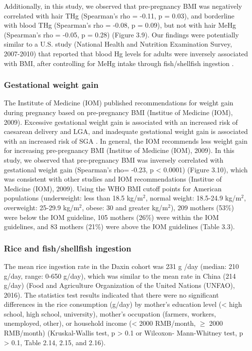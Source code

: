 Additionally, in this study, we observed that pre-pregnancy BMI was negatively correlated with hair THg (Spearman's rho = -0.11, p = 0.03), and borderline with blood THg (Spearman's rho = -0.08, p = 0.09), but not with hair MeHg (Spearman's rho = -0.05, p = 0.28) (Figure 3.9). Our findings were potentially similar to a U.S. study (National Health and Nutrition Examination Survey, 2007-2010) that reported that blood Hg levels for adults were inversely associated with BMI, after controlling for MeHg intake through fish/shellfish ingestion \citep{rothenberg2015influence}.

\subsubsection{Gestational weight gain}

The Institute of Medicine (IOM) published recommendations for weight gain during pregnancy based on pre-pregnancy BMI (Institue of Medicine (IOM), 2009). Excessive gestational weight gain is associated with an increased risk of caesarean delivery and LGA, and inadequate gestational weight gain is associated with an increased risk of SGA \citep{nohr2008combined}. In general, the IOM recommends less weight gain for
increasing pre-pregnancy BMI (Institue of Medicine (IOM), 2009). In this study, we observed that pre-pregnancy BMI was inversely correlated with gestational weight gain (Spearman's rho= -0.23, p < 0.0001) (Figure 3.10), which was consistent with other studies \citep{rode2007association,nohr2008combined,dietz2009low} and IOM recommendations (Institue of Medicine (IOM), 2009). Using the WHO BMI cutoff points for American populations (underweight: less than 18.5 kg/m$^{2}$, normal
weight: 18.5-24.9 kg/m$^{2}$, overweight: 25-29.9 kg/m$^{2}$, obese: 30 and greater kg/m$^{2}$), 209 mothers (53\%) were below the IOM guideline, 105 mothers (26\%) were within the IOM
guidelines, and 83 mothers (21\%) were above the IOM guidelines (Table 3.3).

\subsubsection{Rice and fish/shellfish ingestion}

The mean rice ingestion rate in the Daxin cohort was 231 g /day (median: 210 g/day, range: 0-650 g/day), which was similar to the mean rate in China (214 g/day) (Food and Agriculture Organization of the United Nations (UNFAO), 2016). The statistics test results indicated that there were no significant differences in the rice consumption (g/day) by mother's education level (< high school, high school, university), mother's occupation (farmers, workers, unemployed, other), or household income (< 2000 RMB/month, ${\ge}$ 2000 RMB/month) (Kruskal-Wallis test, p > 0.1 or Wilcoxon- Mann-Whitney test, p > 0.1, Table 2.14, 2.15, and 2.16).

